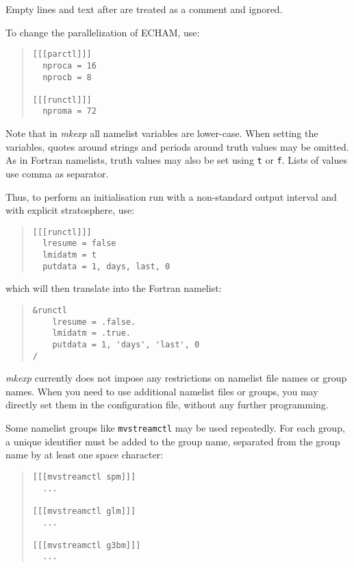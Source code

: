 Empty lines and text after \code{\#} are treated as a comment and ignored.

To change the parallelization of ECHAM, use:

\begin{quote}
\begin{verbatim}
[[[parctl]]]
  nproca = 16
  nprocb = 8

[[[runctl]]]
  nproma = 72
\end{verbatim}
\end{quote}

Note that in \emph{mkexp} all namelist variables are lower-case. When setting
the variables, quotes around strings and periods around truth values may be
omitted. As in Fortran namelists, truth values may also be set using \texttt{t}
or \texttt{f}. Lists of values use comma as separator.

Thus, to perform an initialisation run with a non-standard output interval and
with explicit stratosphere, use:
%
\begin{quote}
\begin{verbatim}
[[[runctl]]]
  lresume = false
  lmidatm = t
  putdata = 1, days, last, 0
\end{verbatim}
\end{quote}

which will then translate into the Fortran namelist:
%
\begin{quote}
\begin{verbatim}
&runctl
    lresume = .false.
    lmidatm = .true.
    putdata = 1, 'days', 'last', 0
/
\end{verbatim}
\end{quote}

\emph{mkexp} currently does not impose any restrictions on namelist file names
or group names. When you need to use additional namelist files or groups, you
may directly set them in the configuration file, without any further
programming.

Some namelist groups like \verb|mvstreamctl| may be used repeatedly. For each
group, a unique identifier must be added to the group name, separated from
the group name by at least one space character:
%
\begin{quote}
\begin{verbatim}
[[[mvstreamctl spm]]]
  ...

[[[mvstreamctl glm]]]
  ...

[[[mvstreamctl g3bm]]]
  ...
\end{verbatim}
\end{quote}

